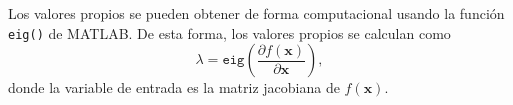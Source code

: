	Los valores propios se pueden obtener de forma computacional usando la función \texttt{eig()} de MATLAB. De esta forma, los valores propios se calculan como
	\begin{equation*}
		\lambda = \texttt{eig}\left(\frac{\partial{f(\mathbf{x})}}{\partial{\mathbf{x}}}\right),
	\end{equation*}
	\noindent donde la variable de entrada es la matriz jacobiana de $f(\mathbf{x})$.		